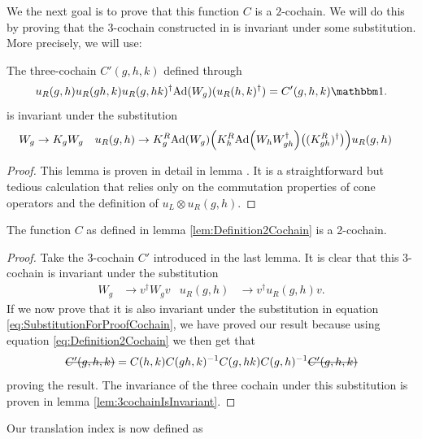 \documentclass[11pt,a4paper,twoside]{article}
\def\version{1}
\newcommand{\versionDifference}[2]{\ifthenelse{\version=0}{#1}{#2}}
\numberwithin{equation}{section}
\begin{document}
	We the next goal is to prove that this function $C$ is a $2$-cochain. We will do this by proving that the $3$-cochain constructed in \cite{ogata2021h3gmathbb} is invariant under some substitution. More precisely, we will use:
	\begin{lemma}\label{lem:3cochainIsInvariant}
		The three-cochain $C'(g,h,k)$ defined through
		\begin{equation}\label{eq:defintion3CochainProof2Cochain}
			u_R(g,h)u_R(gh,k)u_R(g,hk)^\dagger\Ad{W_g}(u_R(h,k)^\dagger)=C'(g,h,k)\id.
		\end{equation}
		is invariant under the substitution
		\begin{align}\label{eq:SubstitutionForProofCochain}
			W_g&\rightarrow K_g W_g&u_R(g,h)&\rightarrow K_g^R\Ad{W_g}\left(K_h^R\Ad{W_hW_{gh}^\dagger}\left((K_{gh}^R)^\dagger\right)\right)u_
			R(g,h)
		\end{align}
	\end{lemma}
	\begin{proof}
		This lemma is proven in detail in lemma \versionDifference{\ref{lem:3cochainIsInvariantAppendix}}{A.1. of \cite{jappens2023spt}}. It is a straightforward but tedious calculation that relies only on the commutation properties of cone operators and the definition of $u_L\otimes u_R(g,h)$.
	\end{proof}
	\begin{lemma}
		The function $C$ as defined in lemma \ref{lem:Definition2Cochain} is a 2-cochain.
	\end{lemma}
	\begin{proof}
		Take the 3-cochain $C'$ introduced in the last lemma. It is clear that this 3-cochain is invariant under the substitution
		\begin{align}
			W_g&\rightarrow v^\dagger W_g v&u_R(g,h)&\rightarrow v^\dagger u_R(g,h)v.
		\end{align}
		If we now prove that it is also invariant under the substitution in equation \ref{eq:SubstitutionForProofCochain}, we have proved our result because using equation \eqref{eq:Definition2Cochain} we then get that
		\begin{equation}
			\stkout{C'(g,h,k)}=C(h,k)C(gh,k)^{-1}C(g,hk)C(g,h)^{-1}\stkout{C'(g,h,k)}
		\end{equation}
		proving the result. The invariance of the three cochain under this substitution is proven in lemma \ref{lem:3cochainIsInvariant}.
	\end{proof}
	Our translation index is now defined as
\end{document}
